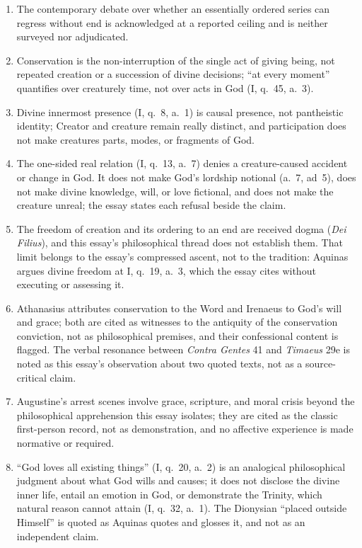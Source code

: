 \begin{enumerate}[leftmargin=1.45em,itemsep=0.25em]
\item The contemporary debate over whether an essentially ordered series can regress without end is acknowledged at a reported ceiling and is neither surveyed nor adjudicated.
\item Conservation is the non-interruption of the single act of giving being, not repeated creation or a succession of divine decisions; ``at every moment'' quantifies over creaturely time, not over acts in God (I, q.~45, a.~3).
\item Divine innermost presence (I, q.~8, a.~1) is causal presence, not pantheistic identity; Creator and creature remain really distinct, and participation does not make creatures parts, modes, or fragments of God.
\item The one-sided real relation (I, q.~13, a.~7) denies a creature-caused accident or change in God. It does not make God's lordship notional (a.~7, ad~5), does not make divine knowledge, will, or love fictional, and does not make the creature unreal; the essay states each refusal beside the claim.
\item The freedom of creation and its ordering to an end are received dogma (\emph{Dei Filius}), and this essay's philosophical thread does not establish them. That limit belongs to the essay's compressed ascent, not to the tradition: Aquinas argues divine freedom at I, q.~19, a.~3, which the essay cites without executing or assessing it.
\item Athanasius attributes conservation to the Word and Irenaeus to God's will and grace; both are cited as witnesses to the antiquity of the conservation conviction, not as philosophical premises, and their confessional content is flagged. The verbal resonance between \emph{Contra Gentes} 41 and \emph{Timaeus} 29e is noted as this essay's observation about two quoted texts, not as a source-critical claim.
\item Augustine's arrest scenes involve grace, scripture, and moral crisis beyond the philosophical apprehension this essay isolates; they are cited as the classic first-person record, not as demonstration, and no affective experience is made normative or required.
\item ``God loves all existing things'' (I, q.~20, a.~2) is an analogical philosophical judgment about what God wills and causes; it does not disclose the divine inner life, entail an emotion in God, or demonstrate the Trinity, which natural reason cannot attain (I, q.~32, a.~1). The Dionysian ``placed outside Himself'' is quoted as Aquinas quotes and glosses it, and not as an independent claim.

\end{enumerate}
